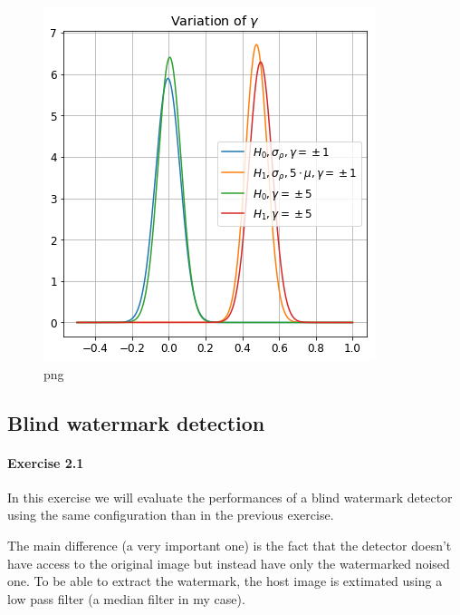 \begin{figure}
\centering
\includegraphics{output_12_2.png}
\caption{png}
\end{figure}

\subsection{Blind watermark detection}\label{blind-watermark-detection}

\paragraph{Exercise 2.1}\label{exercise-2.1}

In this exercise we will evaluate the performances of a blind watermark
detector using the same configuration than in the previous exercise.

The main difference (a very important one) is the fact that the detector
doesn't have access to the original image but instead have only the
watermarked noised one. To be able to extract the watermark, the host
image is extimated using a low pass filter (a median filter in my case).

